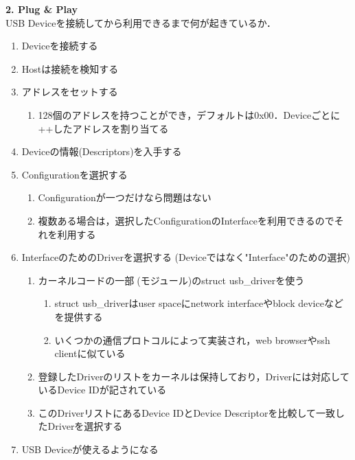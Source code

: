 \documentclass[10pt]{jreport}
\begin{document}
\begin{description}
        \item {\large \textbf{2. Plug \& Play}}\mbox{}\\
        USB Deviceを接続してから利用できるまで何が起きているか．
        \begin{enumerate}
          \item Deviceを接続する
          \item Hostは接続を検知する
          \item アドレスをセットする
          \begin{enumerate}
            \item 128個のアドレスを持つことができ，デフォルトは0x00．Deviceごとに++したアドレスを割り当てる
          \end{enumerate}
          \item Deviceの情報(Descriptors)を入手する
          \item Configurationを選択する
          \begin{enumerate}
            \item Configurationが一つだけなら問題はない
            \item 複数ある場合は，選択したConfigurationのInterfaceを利用できるのでそれを利用する
          \end{enumerate}
          \item InterfaceのためのDriverを選択する (Deviceではなく"Interface"のための選択)
          \begin{enumerate}
            \item カーネルコードの一部(モジュール)のstruct usb\_driverを使う
            \begin{enumerate}
              \item struct usb\_driverはuser spaceにnetwork interfaceやblock deviceなどを提供する
              \item いくつかの通信プロトコルによって実装され，web browserやssh clientに似ている
            \end{enumerate}
            \item 登録したDriverのリストをカーネルは保持しており，Driverには対応しているDevice IDが記されている
            \item このDriverリストにあるDevice IDとDevice Descriptorを比較して一致したDriverを選択する
          \end{enumerate}
          \item USB Deviceが使えるようになる
          \end{enumerate}\\\\


\end{description}
\end{document}
